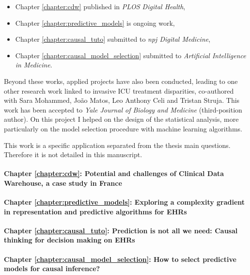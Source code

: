 \documentclass[french,12pt,twoside,a4paper]{book}
\begin{document}
\begin{itemize}
  \item Chapter \ref{chapter:cdw} published in \emph{PLOS Digital Health},
  \item Chapter \ref{chapter:predictive_models} is ongoing work,
  \item Chapter \ref{chapter:causal_tuto} submitted to \emph{npj Digital Medicine},
  \item Chapter \ref{chapter:causal_model_selection} submitted to \emph{Artificial Intelligence in Medicine}.
\end{itemize}

Beyond these works, applied projects have also been conducted, leading to one
other research work linked to invasive ICU treatment disparities, co-authored
with Sara Mohammed, João Matos, Leo Anthony Celi and Tristan Struja. This work
has been accepted to \emph{Yale Journal of Biology and Medicine} (third-position
author). On this project I helped on the design of the statistical analysis,
more particularly on the model selection procedure with machine learning
algorithms.

This work is a specific application separated from the thesis main questions.
Therefore it is not detailed in this manuscript.

\paragraph{Chapter \ref{chapter:cdw}: Potential and challenges of Clinical Data
  Warehouse, a case study in France}


\paragraph{Chapter \ref{chapter:predictive_models}: Exploring a complexity
  gradient in representation and predictive algorithms for EHRs}


\paragraph{Chapter \ref{chapter:causal_tuto}: Prediction is not all we need:
  Causal thinking for decision making on EHRs}


\paragraph{Chapter \ref{chapter:causal_model_selection}: How to select
  predictive models for causal inference?}
\end{document}
